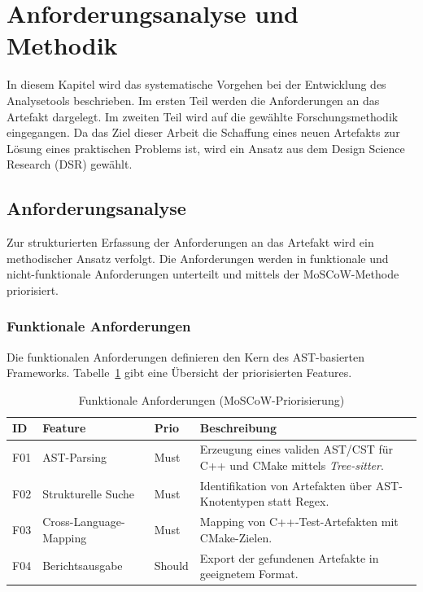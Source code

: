 \documentclass[12pt,titlepage]{article}
\begin{document}

\section{Anforderungsanalyse und Methodik}
In diesem Kapitel wird das systematische Vorgehen bei der Entwicklung des Analysetools beschrieben. Im ersten Teil werden die Anforderungen an das Artefakt dargelegt. Im zweiten Teil wird auf die gewählte Forschungsmethodik eingegangen. Da das Ziel dieser Arbeit die Schaffung eines neuen Artefakts zur Lösung eines praktischen Problems ist, wird ein Ansatz aus dem Design Science Research (DSR) gewählt.

\subsection{Anforderungsanalyse}
\label{sec:anforderungsanalyse}

Zur strukturierten Erfassung der Anforderungen an das Artefakt wird ein methodischer Ansatz verfolgt. Die Anforderungen werden in funktionale und nicht-funktionale Anforderungen unterteilt und mittels der MoSCoW-Methode priorisiert.

\subsubsection{Funktionale Anforderungen}
\label{subsec:funktionale-anforderungen}

Die funktionalen Anforderungen definieren den Kern des AST-basierten Frameworks. Tabelle~\ref{tab:requirements} gibt eine Übersicht der priorisierten Features.

\begin{table}[H]
    \centering
    \small
    \begin{tabularx}{\textwidth}{l l l X}
        \toprule
        \textbf{ID} & \textbf{Feature} & \textbf{Prio} & \textbf{Beschreibung} \\
        \midrule
        F01 & AST-Parsing & Must & Erzeugung eines validen AST/CST für C++ und CMake mittels \textit{Tree-sitter}. \\
        F02 & Strukturelle Suche & Must & Identifikation von Artefakten über AST-Knotentypen statt Regex. \\
        F03 & Cross-Language-Mapping & Must & Mapping von C++-Test-Artefakten mit CMake-Zielen. \\
        F04 & Berichtsausgabe & Should & Export der gefundenen Artefakte in geeignetem Format. \\
        \bottomrule
    \end{tabularx}
    \caption{Funktionale Anforderungen (MoSCoW-Priorisierung)}
    \label{tab:requirements}
\end{table}
\end{document}

